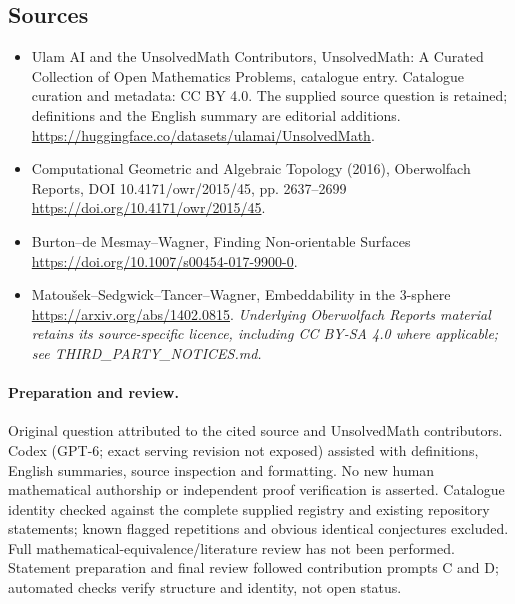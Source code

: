 \documentclass[11pt]{article}
\begin{document}
\subsection{Sources}
\begin{itemize}
\item[\hypertarget{source:statement:1}{S1}] Ulam AI and the UnsolvedMath Contributors, UnsolvedMath: A Curated Collection of Open Mathematics Problems, catalogue entry. Catalogue curation and metadata: CC BY 4.0. The supplied source question is retained; definitions and the English summary are editorial additions.
\url{https://huggingface.co/datasets/ulamai/UnsolvedMath}.
\item[\hypertarget{source:statement:2}{S2}] Computational Geometric and Algebraic Topology (2016), Oberwolfach Reports, DOI 10.4171/owr/2015/45, pp. 2637--2699
\url{https://doi.org/10.4171/owr/2015/45}.
\item[\hypertarget{source:statement:3}{S3}] Burton--de Mesmay--Wagner, Finding Non-orientable Surfaces
\url{https://doi.org/10.1007/s00454-017-9900-0}.
\item[\hypertarget{source:statement:4}{S4}] Matoušek--Sedgwick--Tancer--Wagner, Embeddability in the 3-sphere
\url{https://arxiv.org/abs/1402.0815}.
\textit{Underlying Oberwolfach Reports material retains its source-specific licence, including CC BY-SA 4.0 where applicable; see THIRD\_PARTY\_NOTICES.md.}
\end{itemize}
\paragraph{Preparation and review.}
Original question attributed to the cited source and UnsolvedMath contributors. Codex (GPT-6; exact serving revision not exposed) assisted with definitions, English summaries, source inspection and formatting. No new human mathematical authorship or independent proof verification is asserted. Catalogue identity checked against the complete supplied registry and existing repository statements; known flagged repetitions and obvious identical conjectures excluded. Full mathematical-equivalence/literature review has not been performed. Statement preparation and final review followed contribution prompts C and D; automated checks verify structure and identity, not open status.
\label{end:statement}
\end{document}
